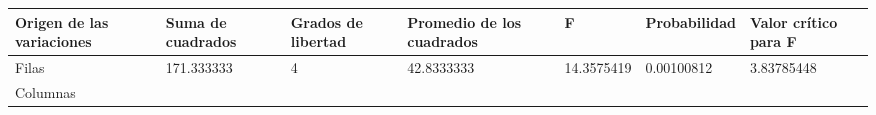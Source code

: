 \documentclass[]{book}
\theoremstyle{definition}
\theoremstyle{definition}
\theoremstyle{definition}
\theoremstyle{remark}
\begin{document}
\begin{longtable}[]{@{}lllllll@{}}
\toprule
\begin{minipage}[b]{0.15\columnwidth}\raggedright
Origen de las variaciones\strut
\end{minipage} & \begin{minipage}[b]{0.11\columnwidth}\raggedright
Suma de cuadrados\strut
\end{minipage} & \begin{minipage}[b]{0.11\columnwidth}\raggedright
Grados de libertad\strut
\end{minipage} & \begin{minipage}[b]{0.15\columnwidth}\raggedright
Promedio de los cuadrados\strut
\end{minipage} & \begin{minipage}[b]{0.07\columnwidth}\raggedright
F\strut
\end{minipage} & \begin{minipage}[b]{0.08\columnwidth}\raggedright
Probabilidad\strut
\end{minipage} & \begin{minipage}[b]{0.13\columnwidth}\raggedright
Valor crítico para F\strut
\end{minipage}\tabularnewline
\midrule
\endhead
\begin{minipage}[t]{0.15\columnwidth}\raggedright
Filas\strut
\end{minipage} & \begin{minipage}[t]{0.11\columnwidth}\raggedright
171.333333\strut
\end{minipage} & \begin{minipage}[t]{0.11\columnwidth}\raggedright
4\strut
\end{minipage} & \begin{minipage}[t]{0.15\columnwidth}\raggedright
42.8333333\strut
\end{minipage} & \begin{minipage}[t]{0.07\columnwidth}\raggedright
14.3575419\strut
\end{minipage} & \begin{minipage}[t]{0.08\columnwidth}\raggedright
0.00100812\strut
\end{minipage} & \begin{minipage}[t]{0.13\columnwidth}\raggedright
3.83785448\strut
\end{minipage}\tabularnewline
\begin{minipage}[t]{0.15\columnwidth}\raggedright
Columnas\strut
\end{minipage} & \begin{minipage}[t]{0.11\columnwidth}\raggedright

\end{minipage}
\end{longtable}
\end{document}
